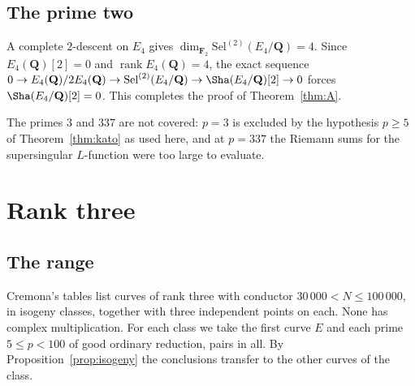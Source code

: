 \documentclass[11pt]{amsart}
\theoremstyle{definition}
\newcommand{\Q}{\mathbf{Q}}
\newcommand{\F}{\mathbf{F}}
\newcommand{\Sel}{\mathrm{Sel}}
\newcommand{\rk}{\operatorname{rank}}
\begin{document}
\subsection{The prime two}
A complete $2$-descent on $E_4$ \cite[\S3.6]{Cre97} gives $\dim_{\F_2}\Sel^{(2)}(E_4/\Q)=4$. Since $E_4(\Q)[2]=0$ and $\rk E_4(\Q)=4$, the exact sequence $0\to E_4(\Q)/2E_4(\Q)\to\Sel^{(2)}(E_4/\Q)\to\Sha(E_4/\Q)[2]\to0$ forces $\Sha(E_4/\Q)[2]=0$. This completes the proof of Theorem~\ref{thm:A}.

The primes $3$ and $337$ are not covered: $p=3$ is excluded by the hypothesis $p\ge5$ of Theorem~\ref{thm:kato} as used here, and at $p=337$ the Riemann sums for the supersingular $L$-function were too large to evaluate.

\section{Rank three}\label{sec:rank3}

\subsection{The range}
Cremona's tables list \NBcurves{} curves of rank three with conductor $30\,000<N\le100\,000$, in \NBclasses{} isogeny classes, together with three independent points on each. None has complex multiplication. For each class we take the first curve $E$ and each prime $5\le p<100$ of good ordinary reduction, \NBtotal{} pairs in all. By Proposition~\ref{prop:isogeny} the conclusions transfer to the other curves of the class.
\end{document}
